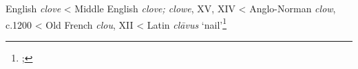 \begin{etymology}\label{ety:clove}
English \textit{clove}
< Middle English \textit{clove; clowe}, XV, XIV
< Anglo-Norman \textit{clow}, c.1200
< Old French \textit{clou}, XII
< Latin \textit{clāvus} `nail'\footnote{; }
\end{etymology}